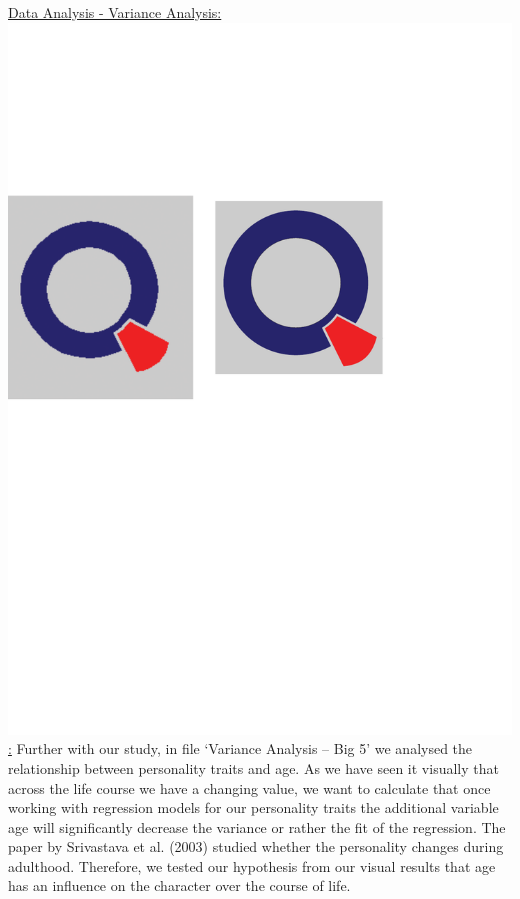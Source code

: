 \underline{Data Analysis - Variance Analysis:
 \href{https://github.com/Matthias2193/SPL/tree/master/Big5VarianceAnalysis}{\includegraphics[scale = 0.06]{Figures/qletlogo.pdf}} :} 
\newline 
\newline
Further with our study, in file `Variance Analysis – Big 5' we analysed the relationship between personality traits and age. As we have seen it visually that across the life course we have a changing value, we want to calculate that once working with regression models for our personality traits the additional variable age will significantly decrease the variance or rather the fit of the regression. The paper by Srivastava et al. (2003) studied whether the personality changes during adulthood. 
\newline \newline
Therefore, we tested our hypothesis from our visual results that age has an influence on the character over the course of life. 
